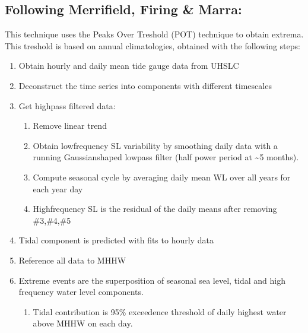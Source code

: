 \documentclass[letterpaper,10pt,english]{jupyterBook}
\begin{document}
\subsection{Following Merrifield, Firing \& Marra:}
\label{\detokenize{notebooks/regional_and_local/SL_Components_intra-annual:following-merrifield-firing-marra}}
\sphinxAtStartPar
This technique uses the Peaks Over Treshold (POT) technique to obtain extrema. This treshold is based on annual climatologies, obtained with the following steps:
\begin{enumerate}
%
\item {} 
\sphinxAtStartPar
Obtain hourly and daily mean tide gauge data from UHSLC

\item {} 
\sphinxAtStartPar
Deconstruct the time series into components with different timescales

\item {} 
\sphinxAtStartPar
Get high\sphinxhyphen{}pass filtered data:
\begin{enumerate}
%
\item {} 
\sphinxAtStartPar
Remove linear trend

\item {} 
\sphinxAtStartPar
Obtain low\sphinxhyphen{}frequency SL variability by smoothing daily data with a running Gaussian\sphinxhyphen{}shaped low\sphinxhyphen{}pass filter (half power period at \textasciitilde{}5 months).

\item {} 
\sphinxAtStartPar
Compute seasonal cycle by averaging daily mean WL over all years for each year day

\item {} 
\sphinxAtStartPar
High\sphinxhyphen{}frequency SL is the residual of the daily means after removing \#3,\#4,\#5

\end{enumerate}

\item {} 
\sphinxAtStartPar
Tidal component is predicted with fits to hourly data

\item {} 
\sphinxAtStartPar
Reference all data to MHHW

\item {} 
\sphinxAtStartPar
Extreme events are the superposition of seasonal sea level, tidal and high frequency water level components.
\begin{enumerate}
%
\item {} 
\sphinxAtStartPar
Tidal contribution is 95\% exceedence threshold of daily highest water above MHHW on each day.


\end{enumerate}
\end{enumerate}
\end{document}
